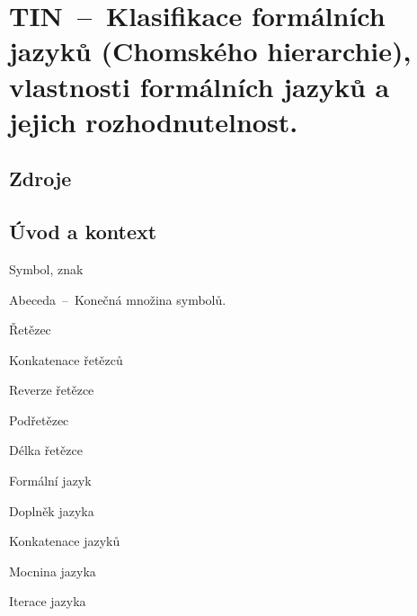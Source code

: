 

\graphicspath{{tin/klasifikace_jazyku/figures}}


\chapter{TIN~--~Klasifikace formálních jazyků (Chomského hierarchie), vlastnosti formálních jazyků a jejich rozhodnutelnost.}



\section{Zdroje}

\begin{compactitem}
    \item {}
    \item {}
    \item {}
    \item {}
    \item {}
\end{compactitem}


\section{Úvod a kontext}

\begin{compactitem}
    \item Symbol, znak
    \item Abeceda~--~Konečná množina symbolů.
    \item Řetězec
    \item Konkatenace řetězců
    \item Reverze řetězce
    \item Podřetězec
    \item Délka řetězce
    \item Formální jazyk
    \item Doplněk jazyka
    \item Konkatenace jazyků
    \item Mocnina jazyka
    \item Iterace jazyka
\end{compactitem}

